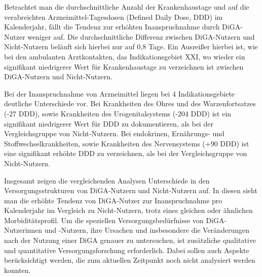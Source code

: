 \documentclass{article}
\begin{document}
			Betrachtet man die durchschnittliche Anzahl der Krankenhaustage und auf die verabreichten Arzneimittel-Tagesdosen (Defined Daily Dose, DDD) im Kalenderjahr, fällt die Tendenz zur erhöhten Inanspruchnahme durch DiGA-Nutzer weniger auf. Die durchschnittliche Differenz zwischen DiGA-Nutzern und Nicht-Nutzern beläuft sich hierbei nur auf 0,8 Tage. Ein Ausreißer hierbei ist, wie bei den ambulanten Arztkontakten, das Indikationsgebiet XXI, wo wieder ein signifikant niedrigerer Wert für Krankenhaustage zu verzeichnen ist zwischen DiGA-Nutzern und Nicht-Nutzern.\par
			Bei der Inanspruchnahme von Arzneimittel liegen bei 4 Indikationsgebiete deutliche Unterschiede vor. Bei Krankheiten des Ohres und des Warzenfortsatzes (-27 DDD), sowie Krankheiten des Urogenitalsystems (-204 DDD) ist ein signifikant niedrigerer Wert für DDD zu dokumentieren, als bei der Vergleichsgruppe von Nicht-Nutzern. Bei endokrinen, Ernährungs- und Stoffwechselkrankheiten, sowie Krankheiten des Nervensystems (+90 DDD) ist eine signifikant erhöhte DDD zu verzeichnen, als bei der Vergleichsgruppe von Nicht-Nutzern.\par
			Insgesamt zeigen die vergleichenden Analysen Unterschiede in den Versorgungsstrukturen von DiGA-Nutzern und Nicht-Nutzern auf. In diesen sieht man die erhöhte Tendenz von DiGA-Nutzer zur Inanspruchnahme pro Kalenderjahr im Vergleich zu Nicht-Nutzern, trotz eines gleichen oder ähnlichen Morbiditätsprofil. Um die speziellen Versorgungsbedürfnisse von DiGA-Nutzerinnen und -Nutzern, ihre Ursachen und insbesondere die Veränderungen nach der Nutzung einer DiGA genauer zu untersuchen, ist zusätzliche qualitative und quantitative Versorgungsforschung erforderlich. Dabei sollen auch Aspekte berücksichtigt werden, die zum aktuellen Zeitpunkt noch nicht analysiert werden konnten.
			
\end{document}
